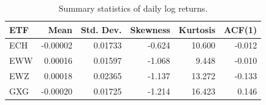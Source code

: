 \begin{table}[!htbp]
\centering
\caption{Summary statistics of daily log returns.}
\label{tab:summary-statistics}
\begin{tabular}{lrrrrr}
\toprule
ETF & Mean & Std. Dev. & Skewness & Kurtosis & ACF(1) \\
\midrule
ECH & -0.00002 & 0.01733 & -0.624 & 10.600 & -0.012 \\
EWW & 0.00016 & 0.01597 & -1.068 & 9.448 & -0.010 \\
EWZ & 0.00018 & 0.02365 & -1.137 & 13.272 & -0.133 \\
GXG & -0.00020 & 0.01725 & -1.214 & 16.423 & 0.146 \\
\bottomrule
\end{tabular}
\end{table}
